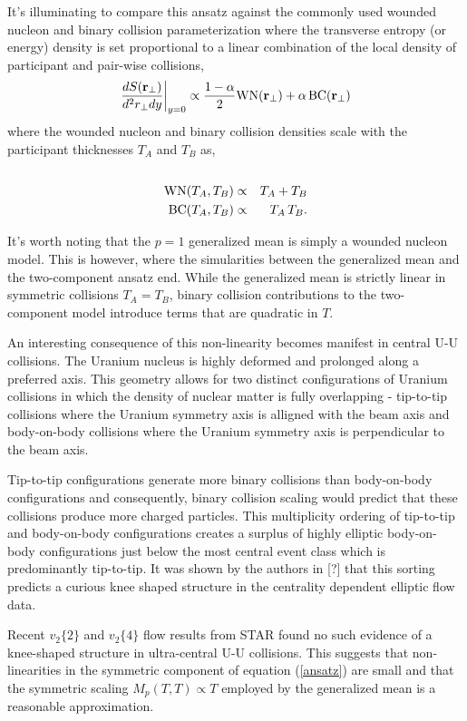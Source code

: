 \documentclass[aps,prl,reprint,amsmath,nofootinbib]{revtex4-1}
\begin{document}
It's illuminating to compare this ansatz against the commonly used wounded nucleon and binary collision parameterization where the transverse entropy (or energy) density 
is set proportional to a linear combination of the local density of participant and pair-wise collisions,
\begin{equation}
 \frac{dS({\bf r}_\perp)}{d^2r_\perp dy} \biggr \rvert_{y=0}  \propto \frac{1-\alpha}{2}\mbox{WN}({\bf r_\perp}) + \alpha\, \mbox{BC}({\bf r_\perp}) 
\end{equation}
where the wounded nucleon and binary collision densities scale with the participant thicknesses $T_A$ and $T_B$ as,
\begin{eqnarray}
 \cr \mbox{WN}(T_A,T_B) &\propto& T_A + T_B \\
 \label{binary collisions}
 \mbox{BC}(T_A,T_B) &\propto& T_A\,T_B.
\end{eqnarray}

It's worth noting that the $p=1$ generalized mean is simply a wounded nucleon model. This is however, where the simularities between the generalized
mean and the two-component ansatz end. While the generalized mean is strictly linear in symmetric collisions $T_A=T_B$, binary collision contributions to the 
two-component model introduce terms that are quadratic in $T$.

An interesting consequence of this non-linearity becomes manifest in central U-U collisions. The Uranium nucleus is highly deformed and prolonged along a preferred 
axis. This geometry allows for two distinct configurations of Uranium collisions in which the density of nuclear matter is fully overlapping - tip-to-tip collisions 
where the Uranium symmetry axis is alligned with the beam axis and body-on-body collisions where the Uranium symmetry axis is perpendicular to the beam axis. 

Tip-to-tip configurations generate more binary collisions than body-on-body configurations and consequently, binary collision scaling would predict that these 
collisions produce more charged particles. This multiplicity ordering of tip-to-tip and body-on-body configurations creates a surplus of highly elliptic 
body-on-body configurations just below the most central event class which is predominantly tip-to-tip. It was shown by the authors in [?] that this sorting predicts 
a curious knee shaped structure in the centrality dependent elliptic flow data. 

Recent $v_2\{2\}$ and $v_2\{4\}$ flow results from STAR found no such evidence of a knee-shaped structure in ultra-central U-U collisions. This suggests that 
non-linearities in the symmetric component of equation (\ref{ansatz}) are small and that the symmetric scaling $M_p(T,T) \propto T$ employed by the generalized mean
is a reasonable approximation.
\end{document}
